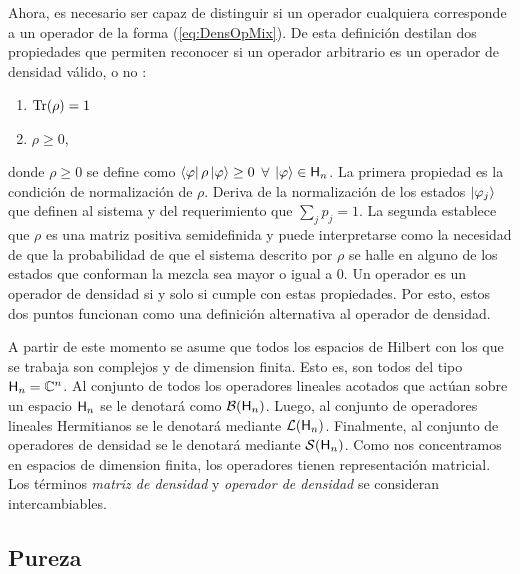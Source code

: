 \fi

Ahora, es necesario ser capaz de distinguir si un operador cualquiera corresponde a un operador de la forma (\ref{eq:DensOpMix}). De esta definición destilan dos propiedades que permiten reconocer si un operador arbitrario es un operador de densidad válido, o no \cite{Holevo}:
\begin{enumerate}
    \item $\Tr(\rho)=1$
    \item $\rho\geq 0$,
\end{enumerate}
donde $\rho\geq 0$ se define como $\bra{\varphi}\rho\ket{\varphi}\geq 0$ $\forall$ $\ket{\varphi}\in{\sf H}_{n}$.
La primera propiedad es la condición de normalización de $\rho$. Deriva de la normalización de los estados $\ket{\varphi_{j}}$ que definen al sistema y del requerimiento que $\sum_{j}p_{j}=1$. La segunda establece que $\rho$ es una matriz positiva semidefinida y puede interpretarse como la necesidad de que la probabilidad de que el sistema descrito por $\rho$ se halle en alguno de los estados que conforman la mezcla sea mayor o igual a $0$. Un operador es un operador de densidad si y solo si cumple con estas propiedades. Por esto, estos dos puntos funcionan como una definición alternativa al operador de densidad.


A partir de este momento se asume que todos los espacios de Hilbert con los que se trabaja son complejos y de dimension finita. Esto es, son todos del tipo ${\sf H}_{n}=\mathbb{C}^{n}$. Al conjunto de todos los operadores lineales acotados que actúan sobre un espacio ${\sf H}_{n}$ se le denotará como $\mathcal{B}({\sf H}_{n})$. Luego, al conjunto de operadores lineales Hermitianos se le denotará mediante $\mathcal{L}({\sf H}_{n})$. Finalmente, al conjunto de operadores de densidad se le denotará mediante $\mathcal{S}({\sf H}_{n})$. Como nos concentramos en espacios de dimension finita, los operadores tienen representación matricial. Los términos \textit{matriz de densidad} y \textit{operador de densidad} se consideran intercambiables.



\subsection{Pureza}

